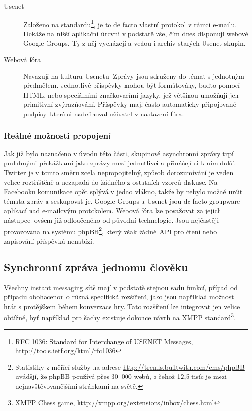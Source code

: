 \documentclass[12pt,oneside,final]{fithesis2}
\begin{document}
\begin{description}
    \item[Usenet]
        Založeno na standardu\footnote{RFC 1036: Standard for Interchange of USENET Messages, \url{http://tools.ietf.org/html/rfc1036}}, je to de facto vlastní protokol v rámci e-mailu. Dokáže na nižší aplikační úrovni v podstatě vše, čím dnes disponují webové Google Groups. Ty z něj vycházejí a vedou i archiv starých Usenet skupin.

    \item[Webová fóra]
        Navazují na kulturu Usenetu. Zprávy jsou sdruženy do témat s jednotným předmětem. Jednotlivé příspěvky mohou být formátovány, buďto pomocí HTML, nebo speciálními značkovacími jazyky, jež většinou umožňují jen primitivní zvýrazňování. Příspěvky mají často automaticky připojované podpisy, které si nadefinoval uživatel v nastavení fóra.
\end{description}

\subsubsection*{Reálné možnosti propojení}
Jak již bylo naznačeno v úvodu této části, skupinové asynchronní zprávy trpí podobnými překážkami jako zprávy mezi jednotlivci a přinášejí si k nim další. Twitter je v tomto směru zcela nepropojitelný, způsob dorozumívání je veden velice roztříštěně a nezapadá do žádného z ostatních vzorců diskuse. Na Facebooku komunikace opět splývá v jedno vlákno, takže by nebylo možné určit témata zpráv a seskupovat je. Google Groups a Usenet jsou de facto groupware aplikací nad e-mailovým protokolem. Webová fóra lze považovat za jejich nástupce, ovšem již odloučeného od původní technologie. Jsou nejčastěji provozována na systému phpBB\footnote{Statistiky z měřící služby na adrese \url{http://trends.builtwith.com/cms/phpBB} uvádějí, že phpBB používá přes 30~000 webů, z čehož 12,5 tisíc je mezi nejnavštěvovanějšími stránkami na světě.}, který však žádné~API pro čtení nebo zapisování příspěvků nenabízí.

\subsection{Synchronní zpráva jednomu člověku}
Všechny instant messaging sítě mají v podstatě stejnou sadu funkcí, případ od případu obohacenou o různá specifická rozšíření, jako jsou například možnost hrát s protějškem během konverzace hry. Tato rozšíření lze integrovat jen velice obtížně, byť například pro šachy existuje dokonce návrh na XMPP standard\footnote{XMPP Chess game, \url{http://xmpp.org/extensions/inbox/chess.html}}.
\end{document}
